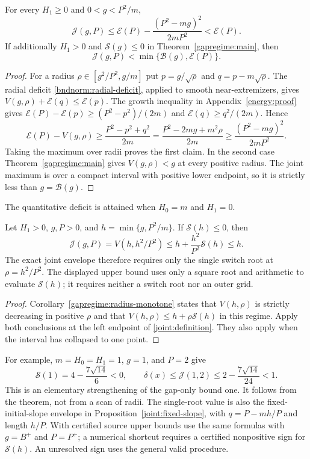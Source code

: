 \begin{corollary}
\label{joint:strict}
For every $H_1\ge0$ and $0<g<P^2/m$,
\[
 \mathcal J(g,P)\le\mathcal E(P)
       -\frac{(P^2-mg)^2}{2mP^2}<\mathcal E(P).
\]
If additionally $H_1>0$ and $\mathcal S(g)\le0$ in
Theorem~\ref{gapregime:main}, then
\[
 \mathcal J(g,P)<\min\{\mathcal B(g),\mathcal E(P)\}.
\]
\end{corollary}
\begin{proof}
For a radius $\rho\in[g^2/P^2,g/m]$ put
$p=g/\sqrt\rho$ and $q=p-m\sqrt\rho$.
The radial deficit \eqref{bndnorm:radial-deficit}, applied to smooth
near-extremizers, gives $V(g,\rho)+\mathcal E(q)\le\mathcal E(p)$.
The growth inequality in Appendix~\ref{energy:proof} gives
$\mathcal E(P)-\mathcal E(p)\ge(P^2-p^2)/(2m)$ and
$\mathcal E(q)\ge q^2/(2m)$. Hence
\[
 \mathcal E(P)-V(g,\rho)
 \ge\frac{P^2-p^2+q^2}{2m}
 =\frac{P^2-2mg+m^2\rho}{2m}
 \ge\frac{(P^2-mg)^2}{2mP^2}.
\]
Taking the maximum over radii proves the first claim.
In the second case Theorem~\ref{gapregime:main} gives
$V(g,\rho)<g$ at every positive radius. The joint maximum is
over a compact interval with positive lower endpoint, so it is
strictly less than $g=\mathcal B(g)$.
\end{proof}
The quantitative deficit is attained when $H_0=m$ and $H_1=0$.

\begin{corollary}
\label{joint:ordinary}
Let $H_1>0$, $g,P>0$, and $h=\min\{g,P^2/m\}$.
If $\mathcal S(h)\le0$, then
\begin{equation}\label{joint:ordinary-formula}
 \boxed{\mathcal J(g,P)=V(h,h^2/P^2)
       \le h+\frac{h^2}{P^2}\mathcal S(h)\le h.}
\end{equation}
The exact joint envelope therefore requires only the single
switch root at $\rho=h^2/P^2$. The displayed upper bound uses
only a square root and arithmetic to evaluate $\mathcal S(h)$;
it requires neither a switch root nor an outer grid.
\end{corollary}
\begin{proof}
Corollary~\ref{gapregime:radius-monotone} states that
$V(h,\rho)$ is strictly decreasing in positive $\rho$ and that
$V(h,\rho)\le h+\rho\mathcal S(h)$ in this regime.
Apply both conclusions at the left endpoint of
\eqref{joint:definition}. They also apply when the interval
has collapsed to one point.
\end{proof}

For example, $m=H_0=H_1=1$, $g=1$, and $P=2$ give
\[
 \mathcal S(1)=4-\frac{7\sqrt{14}}6<0,\qquad
 \delta(x)\le\mathcal J(1,2)
 \le2-\frac{7\sqrt{14}}{24}<1.
\]
This is an elementary strengthening of the gap-only bound one.
It follows from the theorem, not from a scan of radii.
The single-root value is also the fixed-initial-slope envelope
in Proposition~\ref{joint:fixed-slope}, with
$q=P-mh/P$ and length $h/P$.
With certified source upper bounds use the same formulas with
$g=B^+$ and $P=P^+$; a numerical shortcut requires a certified
nonpositive sign for $\mathcal S(h)$. An unresolved sign uses
the general valid procedure.

